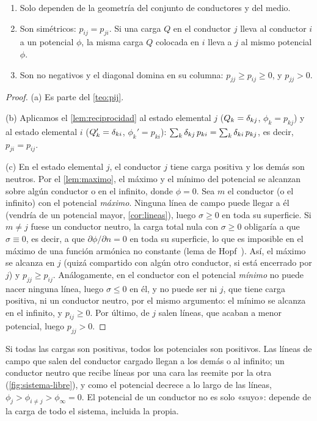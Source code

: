\begin{teorema}\label{teo:pij-prop}
\begin{enumerate}[label=\textup{(\alph*)}]
  \item Solo dependen de la geometría del conjunto de conductores y del medio.
  \item Son simétricos: $p_{ij}=p_{ji}$. Si una carga $Q$ en el conductor $j$ lleva al conductor $i$ a un potencial $\phi$, la misma carga $Q$ colocada en $i$
        lleva a $j$ al mismo potencial $\phi$.
  \item Son no negativos y el diagonal domina en su columna: $p_{jj}\ge p_{ij}\ge0$, y $p_{jj}>0$.
\end{enumerate}
\end{teorema}
\begin{proof}
(a) Es parte del \cref{teo:pij}.

(b) Aplicamos el \cref{lem:reciprocidad} al estado elemental $j$ ($Q_k=\delta_{kj}$, $\phi_k=p_{kj}$) y al estado elemental $i$
($Q_k'=\delta_{ki}$, $\phi_k'=p_{ki}$): $\sum_k\delta_{kj}\,p_{ki}=\sum_k\delta_{ki}\,p_{kj}$, es decir, $p_{ji}=p_{ij}$.

(c) En el estado elemental $j$, el conductor $j$ tiene carga positiva y los demás son neutros. Por el \cref{lem:maximo}, el máximo y el mínimo del
potencial se alcanzan sobre algún conductor o en el infinito, donde $\phi=0$. Sea $m$ el conductor (o el infinito) con el potencial \emph{máximo}. Ninguna
línea de campo puede llegar a él (vendría de un potencial mayor, \cref{cor:lineas}), luego $\sigma\ge0$ en toda su superficie. Si $m\neq j$ fuese un
conductor neutro, la carga total nula con $\sigma\ge0$ obligaría a que $\sigma\equiv0$, es decir, a que $\partial\phi/\partial n=0$ en toda su
superficie, lo que es imposible en el máximo de una función armónica no constante (lema de Hopf~\cite{KELLOGG}). Así, el máximo se alcanza en $j$
(quizá compartido con algún otro conductor, si está encerrado por $j$) y $p_{jj}\ge p_{ij}$. Análogamente, en el conductor con el potencial
\emph{mínimo} no puede nacer ninguna línea, luego $\sigma\le0$ en él, y no puede ser ni $j$, que tiene carga positiva, ni un conductor neutro, por
el mismo argumento: el mínimo se alcanza en el infinito, y $p_{ij}\ge0$. Por
último, de $j$ salen líneas, que acaban a menor potencial, luego $p_{jj}>0$.
\end{proof}

\begin{observacion}\label{obs:pij-signo}
Si todas las cargas son positivas, todos los potenciales son positivos. Las líneas de campo que salen del conductor cargado llegan a los demás o al
infinito; un conductor neutro que recibe líneas por una cara las reemite por la otra (\cref{fig:sistema-libre}), y como el potencial decrece a lo
largo de las líneas, $\phi_j>\phi_{i\neq j}>\phi_{\infty}=0$. El potencial de un conductor no es solo «suyo»: depende de la carga de todo el sistema,
incluida la propia.
\end{observacion}

